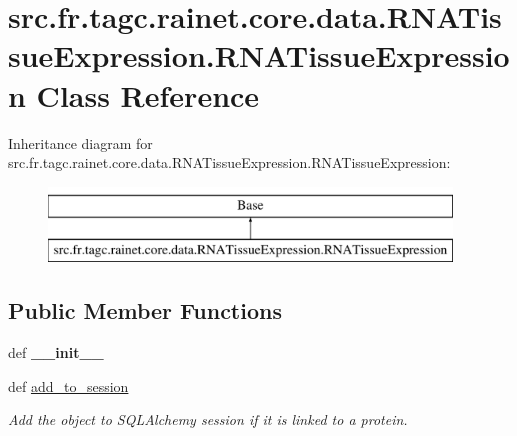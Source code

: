 \hypertarget{classsrc_1_1fr_1_1tagc_1_1rainet_1_1core_1_1data_1_1RNATissueExpression_1_1RNATissueExpression}{\section{src.\-fr.\-tagc.\-rainet.\-core.\-data.\-R\-N\-A\-Tissue\-Expression.\-R\-N\-A\-Tissue\-Expression Class Reference}
\label{classsrc_1_1fr_1_1tagc_1_1rainet_1_1core_1_1data_1_1RNATissueExpression_1_1RNATissueExpression}
}
Inheritance diagram for src.\-fr.\-tagc.\-rainet.\-core.\-data.\-R\-N\-A\-Tissue\-Expression.\-R\-N\-A\-Tissue\-Expression\-:\begin{figure}[H]
\begin{center}
\leavevmode
\includegraphics[height=2.000000cm]{classsrc_1_1fr_1_1tagc_1_1rainet_1_1core_1_1data_1_1RNATissueExpression_1_1RNATissueExpression}
\end{center}
\end{figure}
\subsection*{Public Member Functions}
\begin{DoxyCompactItemize}
\item 
\hypertarget{classsrc_1_1fr_1_1tagc_1_1rainet_1_1core_1_1data_1_1RNATissueExpression_1_1RNATissueExpression_a99f312f2e9e6b0c885e9f549aa6c4349}{def {\bfseries \-\_\-\-\_\-init\-\_\-\-\_\-}}\label{classsrc_1_1fr_1_1tagc_1_1rainet_1_1core_1_1data_1_1RNATissueExpression_1_1RNATissueExpression_a99f312f2e9e6b0c885e9f549aa6c4349}

\item 
\hypertarget{classsrc_1_1fr_1_1tagc_1_1rainet_1_1core_1_1data_1_1RNATissueExpression_1_1RNATissueExpression_a11e26b476691df59e8f0939c9cc3dddf}{def \hyperlink{classsrc_1_1fr_1_1tagc_1_1rainet_1_1core_1_1data_1_1RNATissueExpression_1_1RNATissueExpression_a11e26b476691df59e8f0939c9cc3dddf}{add\-\_\-to\-\_\-session}}\label{classsrc_1_1fr_1_1tagc_1_1rainet_1_1core_1_1data_1_1RNATissueExpression_1_1RNATissueExpression_a11e26b476691df59e8f0939c9cc3dddf}

\begin{DoxyCompactList}\small\item\em Add the object to S\-Q\-L\-Alchemy session if it is linked to a protein. \end{DoxyCompactList}\end{DoxyCompactItemize}
